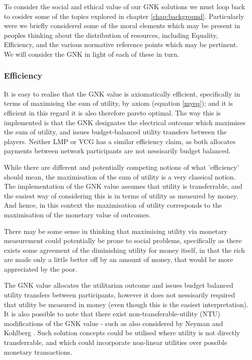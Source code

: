 To consider the social and ethical value of our GNK solutions we must loop back to cosider some of the topics explored in chapter \ref{chap:background}.
Particularly were we briefly considered some of the moral elements which may be present in peoples thinking about the distribution of resources, including Equality, Efficiency, and the various normative reference points which may be pertinent.
We will consider the GNK in light of each of these in turn.

\subsubsection*{Efficiency}
It is easy to realise that the GNK value is axiomatically efficient, specifically in terms of maximising the sum of utility, by axiom (equation \ref{myeq}); and it is efficient in this regard it is also therefore pareto optimal.
The way this is implemented is that the GNK designates the electrical outcome which maximises the sum of utility, and issues budget-balanced utility transfers between the players.
Neither LMP or VCG has a similar efficiency claim, as both allocates payments between network participants are not nessisarily budget balanced.

While there are different and potentially competing notions of what 'efficiency' should mean, the maximisation of the sum of utility is a very classical notion.
The implementation of the GNK value assumes that utility is transferrable, and the easiest way of considering this is in terms of utility as measured by money. And hence, in this context the maximisation of utility corresponds to the maximisation of the monetary value of outcomes.

There may be some sense in thinking that maximising utility via monetary measurement could potentially be prone to social problems, specifically as there exists some agreement of the diminishing utility for money itself, in that the rich are made only a little better off by an amount of money, that would be more appreciated by the poor.

The GNK value allocates the utilitarian outcome and issues budget balanced utility transfers between participants, however it does not nessisarily required that utility be measured in money (even though this is the easiest interpretation).
It is also possible to note that there exist non-transferable-utility (NTU) modifications of the GNK value - such as also considered by Neyman and Kohlberg \cite{value1}.
Such solution concepts could be utilised where utility is not directly transferrable, and which could incorporate non-linear utilities over possible monetary transactions.

